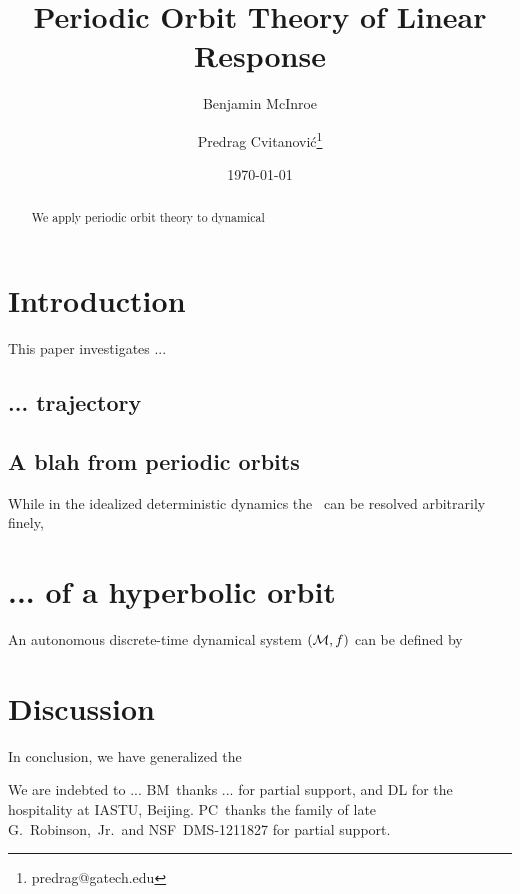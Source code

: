 \documentclass[pre,aps,twocolumn,showpacs,hyperref]{revtex4-1} %
\begin{document}
\title{
Periodic Orbit Theory of Linear Response
}
\author{Benjamin McInroe}
\author{Predrag Cvitanovi\'c\footnote{predrag@gatech.edu}}
\date{\today}

	\begin{abstract}
We apply periodic orbit theory to dynamical
	\end{abstract}


\maketitle
\section{Introduction}

This paper investigates ...

\subsection{... trajectory}



\subsection{A blah from periodic orbits}

While in the idealized deterministic dynamics the \statesp\ can be
resolved arbitrarily finely,


\section{... of a hyperbolic orbit}
An autonomous discrete-time dynamical system $({\cal M}, f)$ can be defined by
\section{Discussion}
In conclusion, we have generalized the

\begin{acknowledgments}
We are indebted to ...
BM\ thanks ... for partial support, and DL for the hospitality at IASTU, Beijing.
PC\ thanks the family of late G.~Robinson,~Jr.\ and NSF~DMS-1211827 for
partial support.
\end{acknowledgments}


 

\ifboyscout
\newpage
%
%
\fi
\end{document}
